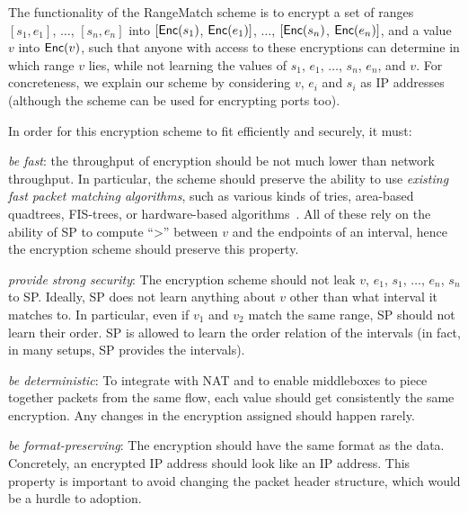 %
The functionality of the RangeMatch scheme is to encrypt a set of ranges $[s_1, e_1]$, $\dots$, $[s_n, e_n]$ into  $[\mathsf{Enc}(s_1)$, $\mathsf{Enc}(e_1)]$, $\dots$, $[\mathsf{Enc}(s_n)$,  $\mathsf{Enc}(e_n)]$, and a value $v$ into $\mathsf{Enc}(v)$, such that anyone with access to these encryptions can determine in which range $v$ lies, while not learning the values of $s_1$, $e_1$, $\dots$, $s_n$, $e_n$, and $v$. 
For concreteness, we explain our scheme by considering $v$, $e_i$ and $s_i$ as IP addresses (although the scheme can be used for encrypting ports too).

%
In order for this encryption scheme to fit \sys efficiently and securely, it must:

\begin{CompactEnumerate}[leftmargin=*]

\item  {\em be fast}: the throughput of encryption should be not much lower than network throughput. In particular, the scheme should preserve the ability to use {\em existing fast packet matching algorithms}, such as  various kinds of tries, area-based quadtrees, FIS-trees, or hardware-based algorithms~\cite{packet_classif}.  All of these rely on the ability of SP  to compute ``>'' between $v$ and the endpoints of an interval,
hence the encryption scheme should preserve this property. 




\item {\em provide strong security}: The encryption scheme should not leak $v$, $e_1$, $s_1$, $\dots$, $e_n$, $s_n$ to SP.
Ideally, SP does not learn anything about $v$ other than what interval it matches to. In  particular, even if $v_1$ and $v_2$ match the same range, SP should not learn their order. SP is allowed to learn the order relation of the intervals (in fact, in many setups, SP provides the intervals). \label{req:sec}


\item {\em be deterministic}: To integrate with NAT and to enable middleboxes to piece together packets from the same flow, each value should get  consistently  the same encryption. Any changes in the encryption assigned should happen rarely.  \label{req:injective}

\item {\em be format-preserving}: The encryption should have the same format as the data. Concretely, an encrypted IP address should look like an IP address.  This property is important to avoid changing the packet header structure, which would be a hurdle to adoption. 
 \end{CompactEnumerate}


